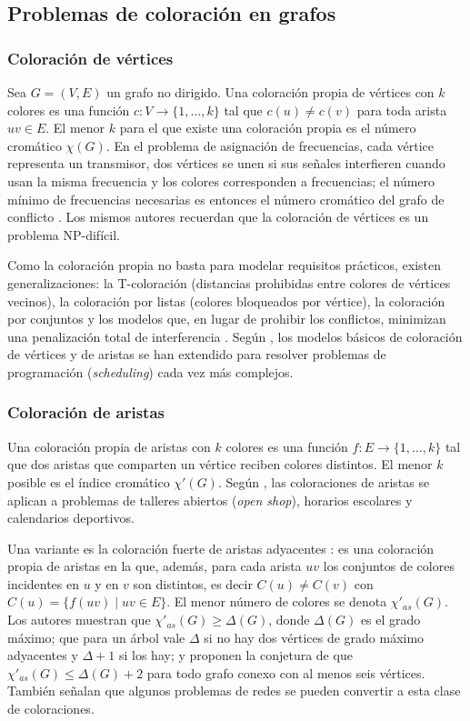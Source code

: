 \subsection{Problemas de coloración en grafos}
\label{sec:coloracion}

\subsubsection{Coloración de vértices}

Sea $G=(V,E)$ un grafo no dirigido. Una coloración propia de vértices con $k$ colores es una función $c:V\to\{1,\dots,k\}$ tal que $c(u)\neq c(v)$ para toda arista $uv\in E$. El menor $k$ para el que existe una coloración propia es el número cromático $\chi(G)$. En el problema de asignación de frecuencias, cada vértice representa un transmisor, dos vértices se unen si sus señales interfieren cuando usan la misma frecuencia y los colores corresponden a frecuencias; el número mínimo de frecuencias necesarias es entonces el número cromático del grafo de conflicto \parencite{eisenblatter2002}. Los mismos autores recuerdan que la coloración de vértices es un problema NP-difícil.

Como la coloración propia no basta para modelar requisitos prácticos, existen generalizaciones: la T-coloración (distancias prohibidas entre colores de vértices vecinos), la coloración por listas (colores bloqueados por vértice), la coloración por conjuntos y los modelos que, en lugar de prohibir los conflictos, minimizan una penalización total de interferencia \parencite{eisenblatter2002}. Según \textcite{dewerra2015}, los modelos básicos de coloración de vértices y de aristas se han extendido para resolver problemas de programación (\textit{scheduling}) cada vez más complejos.

\subsubsection{Coloración de aristas}

Una coloración propia de aristas con $k$ colores es una función $f:E\to\{1,\dots,k\}$ tal que dos aristas que comparten un vértice reciben colores distintos. El menor $k$ posible es el índice cromático $\chi'(G)$. Según \textcite{dewerra2015}, las coloraciones de aristas se aplican a problemas de talleres abiertos (\textit{open shop}), horarios escolares y calendarios deportivos.

Una variante es la coloración fuerte de aristas adyacentes \parencite{zhang2002}: es una coloración propia de aristas en la que, además, para cada arista $uv$ los conjuntos de colores incidentes en $u$ y en $v$ son distintos, es decir $C(u)\neq C(v)$ con $C(u)=\{f(uv)\mid uv\in E\}$. El menor número de colores se denota $\chi'_{as}(G)$. Los autores muestran que $\chi'_{as}(G)\geq\Delta(G)$, donde $\Delta(G)$ es el grado máximo; que para un árbol vale $\Delta$ si no hay dos vértices de grado máximo adyacentes y $\Delta+1$ si los hay; y proponen la conjetura de que $\chi'_{as}(G)\leq\Delta(G)+2$ para todo grafo conexo con al menos seis vértices. También señalan que algunos problemas de redes se pueden convertir a esta clase de coloraciones.

